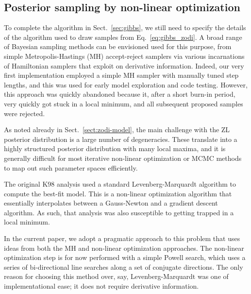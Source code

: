 \documentclass[twocolumn]{aa}
\begin{document}
\subsection{Posterior sampling by non-linear optimization}
\label{sec:nonlin}


To complete the algorithm in Sect.~\ref{sec:gibbs}, we still need to
specify the details of the algorithm used to draw samples from
Eq.~\eqref{eq:gibbs_zodi}. A broad range of Bayesian sampling methods
can be envisioned used for this purpose, from simple
Metropolis-Hastings (MH) accept-reject samplers via various
incarnations of Hamiltonian samplers that exploit on derivative
information. Indeed, our very first implementation employed a simple
MH sampler with manually tuned step lengths, and this was used for
early model exploration and code testing. However, this approach was
quickly abandoned because it, after a short burn-in period, very
quickly got stuck in a local minimum, and all subsequent proposed
samples were rejected.

As noted already in Sect.~\ref{sect:zodi-model}, the main challenge
with the ZL posterior distribution is a large number of
degeneracies. These translate into a highly structured posterior
distribution with many local maxima, and it is generally difficult for
most iterative non-linear optimization or MCMC methods to map out such
parameter spaces efficiently.

The original K98 analysis used a standard Levenberg-Marquardt
algorithm to compute the best-fit model. This is a non-linear
optimization algorithm that essentially interpolates between a
Gauss-Newton and a gradient descent algorithm. As such, that analysis
was also susceptible to getting trapped in a local minimum.

In the current paper, we adopt a pragmatic approach to this problem
that uses ideas from both the MH and non-linear optimization
approaches. The non-linear optimization step is for now performed with
a simple Powell search, which uses a series of bi-directional line
searches along a set of conjugate directions. The only reason for
choosing this method over, say, Levenberg-Marquardt was one of
implementational ease; it does not require derivative information.
\end{document}
